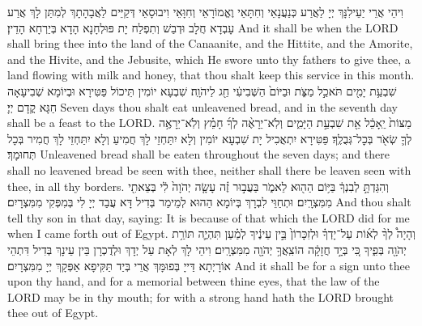 {{{}}
{וִיהֵי אֲרֵי יַעֵילִנָּךְ יְיָ לַאֲרַע כְּנַעֲנָאֵי וְחִתָּאֵי וֶאֱמוֹרָאֵי וְחִוָּאֵי וִיבוּסָאֵי דְּקַיֵּים לַאֲבָהָתָךְ לְמִתַּן לָךְ אֲרַע עָבְדָא חֲלָב וּדְבַשׁ וְתִפְלַח יָת פּוּלְחָנָא הָדָא בְּיַרְחָא הָדֵין׃}
{And it shall be when the LORD shall bring thee into the land of the Canaanite, and the Hittite, and the Amorite, and the Hivite, and the Jebusite, which He swore unto thy fathers to give thee, a land flowing with milk and honey, that thou shalt keep this service in this month.}{}
{שִׁבְעַ֥ת יָמִ֖ים תֹּאכַ֣ל מַצֹּ֑ת וּבַיּוֹם֙ הַשְּׁבִיעִ֔י חַ֖ג לַיהֹוָֽה׃}
{שִׁבְעָא יוֹמִין תֵּיכוֹל פַּטִּירָא וּבְיוֹמָא שְׁבִיעָאָה חַגָּא קֳדָם יְיָ׃}
{Seven days thou shalt eat unleavened bread, and in the seventh day shall be a feast to the LORD.}{}
{מַצּוֹת֙ יֵֽאָכֵ֔ל אֵ֖ת שִׁבְעַ֣ת הַיָּמִ֑ים וְלֹֽא־יֵרָאֶ֨ה לְךָ֜ חָמֵ֗ץ וְלֹֽא־יֵרָאֶ֥ה לְךָ֛ שְׂאֹ֖ר בְּכׇל־גְּבֻלֶֽךָ׃}
{פַּטִּירָא יִתְאֲכִיל יָת שִׁבְעָא יוֹמִין וְלָא יִתַּחְזֵי לָךְ חֲמִיעַ וְלָא יִתַּחְזֵי לָךְ חֲמִיר בְּכָל תְּחוּמָךְ׃}
{Unleavened bread shall be eaten throughout the seven days; and there shall no leavened bread be seen with thee, neither shall there be leaven seen with thee, in all thy borders.}{}
{וְהִגַּדְתָּ֣ לְבִנְךָ֔ בַּיּ֥וֹם הַה֖וּא לֵאמֹ֑ר בַּעֲב֣וּר זֶ֗ה עָשָׂ֤ה יְהֹוָה֙ לִ֔י בְּצֵאתִ֖י מִמִּצְרָֽיִם׃
}
{וּתְחַוֵּי לִבְרָךְ בְּיוֹמָא הַהוּא לְמֵימַר בְּדִיל דָּא עֲבַד יְיָ לִי בְּמִפְּקִי מִמִּצְרָיִם׃}
{And thou shalt tell thy son in that day, saying: It is because of that which the LORD did for me when I came forth out of Egypt.}{}
{וְהָיָה֩ לְךָ֨ לְא֜וֹת עַל־יָדְךָ֗ וּלְזִכָּרוֹן֙ בֵּ֣ין עֵינֶ֔יךָ לְמַ֗עַן תִּהְיֶ֛ה תּוֹרַ֥ת יְהֹוָ֖ה בְּפִ֑יךָ כִּ֚י בְּיָ֣ד חֲזָקָ֔ה הוֹצִֽאֲךָ֥ יְהֹוָ֖ה מִמִּצְרָֽיִם׃
}
{וִיהֵי לָךְ לְאָת עַל יְדָךְ וּלְדֻכְרָן בֵּין עֵינָךְ בְּדִיל דִּתְהֵי אוֹרָיְתָא דַּייָ בְּפוּמָּךְ אֲרֵי בְּיַד תַּקִּיפָא אַפְּקָךְ יְיָ מִמִּצְרָיִם׃}
{And it shall be for a sign unto thee upon thy hand, and for a memorial between thine eyes, that the law of the LORD may be in thy mouth; for with a strong hand hath the LORD brought thee out of Egypt.}{}
}
